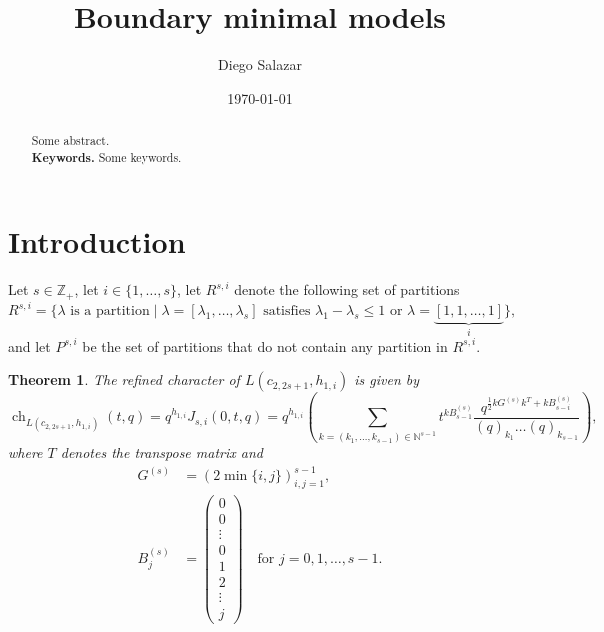 \documentclass[a4paper, 12pt, reqno]{amsart}
\newtheorem{theorem}{Theorem}[section]
\theoremstyle{remark}
\DeclareMathOperator{\ch}{ch}
\begin{document}
\setcounter{section}{-1}

\begin{abstract}
  Some abstract. \\
  \smallskip
  \noindent \textbf{Keywords.} Some keywords.
\end{abstract}

\title{Boundary minimal models}
\author{Diego Salazar}
\address{Instituto de Matemática Pura e Aplicada, Rio de Janeiro, RJ, Brazil}
\date{\today}
\maketitle

\section{Introduction}
\label{sec:introduction}

Let $s \in \mathbb{Z}_+$, let $i \in \{1, \dots, s\}$, let $R^{s, i}$ denote the following set of partitions
\begin{equation*}
  R^{s, i} = \{\text{$\lambda$ is a partition} \mid \text{$\lambda = [\lambda_1, \dots, \lambda_s]$ satisfies $\lambda_1 - \lambda_s \le 1$ or $\lambda = \underbrace{[1, 1, \dots, 1]}_i$}\},
\end{equation*}
and let $P^{s, i}$ be the set of partitions that do not contain any partition in $R^{s, i}$.

\begin{theorem}
  \label{thr:1}
  The refined character of $L(c_{2, 2s + 1}, h_{1, i})$ is given by
  \begin{equation*}
    \ch_{L(c_{2, 2s + 1}, h_{1, i})}(t, q) = q^{h_{1, i}}J_{s, i}(0, t, q) = q^{h_{1, i}}\left(\sum_{k = (k_1, \dots, k_{s - 1}) \in \mathbb{N}^{s - 1}}t^{kB^{(s)}_{s - 1}}\frac{q^{\frac{1}{2}kG^{(s)}k^T + kB^{(s)}_{s - i}}}{(q)_{k_1}\dots(q)_{k_{s - 1}}}\right),
  \end{equation*}
  where $T$ denotes the transpose matrix and
  \begin{align*}
    G^{(s)} &= (2\min\{i, j\})_{i, j = 1}^{s - 1}, \\
    B^{(s)}_j &=
                \left(\begin{smallmatrix}
                  0 \\
                  0 \\
                  \vdots \\
                  0 \\
                  1 \\
                  2 \\
                  \vdots \\
                  j
                \end{smallmatrix}\right) \quad \text{for $j = 0, 1, \dots, s - 1$}.
  \end{align*}
\end{theorem}
\end{document}
